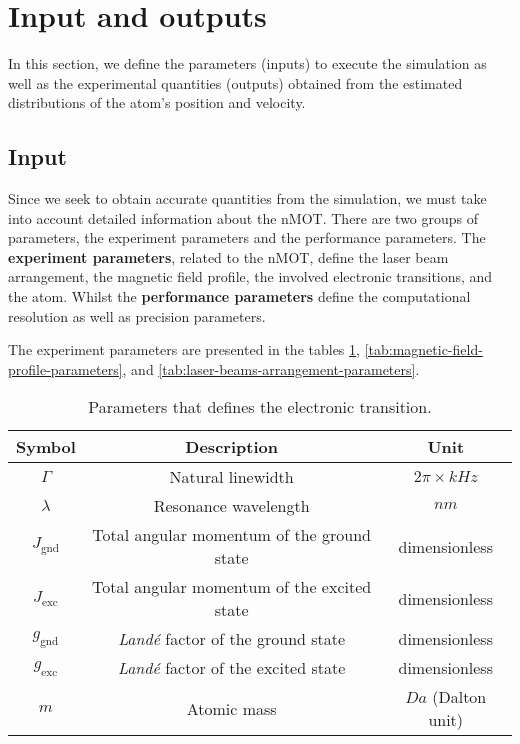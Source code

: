 %
\section{Input and outputs}
\label{sec:input-outputs}
%

In this section, we define the parameters (inputs) to execute the simulation as well as the experimental quantities (outputs) obtained from the estimated distributions of the atom's position and velocity.

\subsection{Input}
\label{sec:input}

Since we seek to obtain accurate quantities from the simulation, we must take into account detailed information about the nMOT. There are two groups of parameters, the experiment parameters and the performance parameters. The \textbf{experiment parameters}, related to the nMOT, define the laser beam arrangement, the magnetic field profile, the involved electronic transitions, and the atom. Whilst the \textbf{performance parameters} define the computational resolution as well as precision parameters.

The experiment parameters are presented in the tables \ref{tab:transition-parameters}, \ref{tab:magnetic-field-profile-parameters}, and \ref{tab:laser-beams-arrangement-parameters}.
\begin{table}[ht!]
    \centering
    \begin{tabular}{|c|c|c|}
        \hline
        \textbf{Symbol} & \textbf{Description} & \textbf{Unit} \\ \hline
        $ \Gamma $ & Natural linewidth & $ 2\pi \times kHz $ \\
        $ \lambda $ & Resonance wavelength & $ nm $ \\
        $ J_{\textrm{gnd}} $ & Total angular momentum of the ground state & dimensionless \\
        $ J_{\textrm{exc}} $ & Total angular momentum of the excited state & dimensionless \\
        $ g_{\textrm{gnd}} $ & \textit{Landé} factor of the ground state & dimensionless \\
        $ g_{\textrm{exc}} $ & \textit{Landé} factor of the excited state & dimensionless \\
        $ m $ & Atomic mass & $ Da $ (Dalton unit) \\
        \hline
    \end{tabular}
    \caption{Parameters that defines the electronic transition.}
    \label{tab:transition-parameters}
\end{table}

